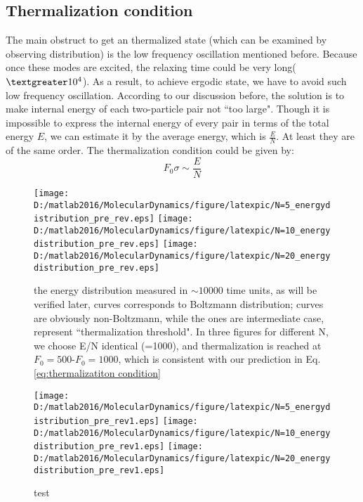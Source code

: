 \documentclass[aps,pre,twocolumn,groupedaddress]{revtex4-1}
\begin{document}
\subsection{Thermalization condition}
The main obstruct to get an thermalized state (which can be examined by observing distribution) is the low frequency oscillation mentioned before. Because once these modes are excited, the relaxing time could be very long($\textgreater 10^4$). As a result, to achieve ergodic state, we have to avoid such low frequency oscillation. According to our discussion before, the solution is to make internal energy of each two-particle pair not ``too large". Though it is impossible to express the internal energy of every pair in terms of the total energy $E$, we can estimate it by the average energy, which is $\frac{E}{N}$. At least they are of the same order. The thermalization condition could be given by:
\begin{equation}
F_0\sigma\sim\frac{E}{N}
\label{eq:thermalizatiton condition}
\end{equation}



\begin{figure}[hbtp]
\centering
\texttt{[image: D:/matlab2016/MolecularDynamics/figure/latexpic/N=5\_energydistribution\_pre\_rev.eps]} 
\texttt{[image: D:/matlab2016/MolecularDynamics/figure/latexpic/N=10\_energydistribution\_pre\_rev.eps]}
\texttt{[image: D:/matlab2016/MolecularDynamics/figure/latexpic/N=20\_energydistribution\_pre\_rev.eps]}
\caption{the energy distribution measured in $\sim 10000$ time units, as will be verified later, {\color{green}{green}} curves corresponds to Boltzmann distribution; {\color{red}{red}} curves are obviously non-Boltzmann, while the {\color{yellow}{yellow}} ones are intermediate case, represent ``thermalization threshold". In three figures for different N, we choose E/N identical (=1000), and thermalization is reached at $F_0=500$-$F_0=1000$, which is consistent with our prediction in Eq.\ref{eq:thermalizatiton condition}}
\label{fig:thermalization5}

\end{figure}

\begin{figure}[hbtp]
\centering
\texttt{[image: D:/matlab2016/MolecularDynamics/figure/latexpic/N=5\_energydistribution\_pre\_rev1.eps]} 
\texttt{[image: D:/matlab2016/MolecularDynamics/figure/latexpic/N=10\_energydistribution\_pre\_rev1.eps]}
\texttt{[image: D:/matlab2016/MolecularDynamics/figure/latexpic/N=20\_energydistribution\_pre\_rev1.eps]}
\caption{test}
\end{figure}
\end{document}
